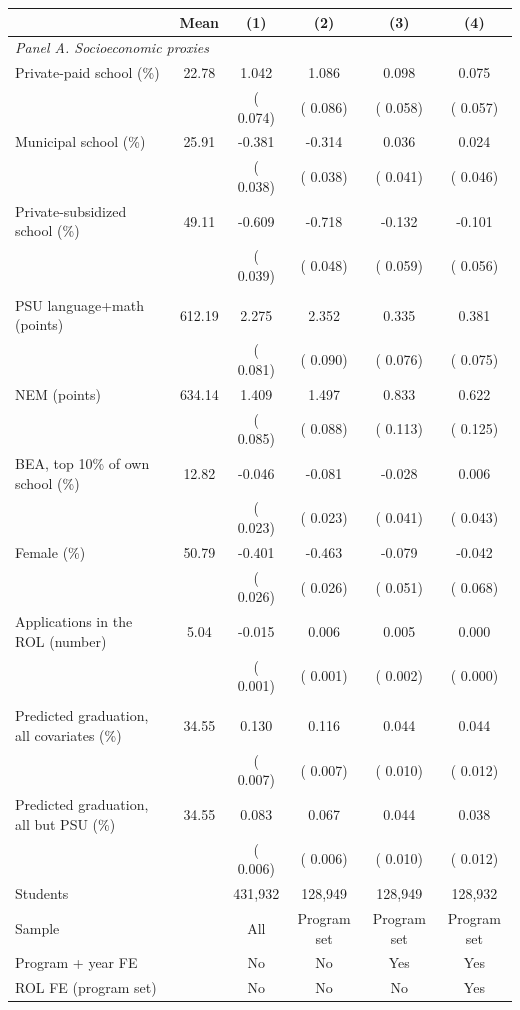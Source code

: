 \begin{tabular}{lccccc}
\toprule
 & Mean & (1) & (2) & (3) & (4) \\
\midrule
\multicolumn{6}{l}{\textit{Panel A. Socioeconomic proxies}} \\
Private-paid school (\%) &  22.78 &   1.042\sym{***} &   1.086\sym{***} &   0.098\sym{*} &   0.075 \\
 & & ( 0.074) & ( 0.086) & ( 0.058) & ( 0.057) \\
Municipal school (\%) &  25.91 &  -0.381\sym{***} &  -0.314\sym{***} &   0.036 &   0.024 \\
 & & ( 0.038) & ( 0.038) & ( 0.041) & ( 0.046) \\
Private-subsidized school (\%) &  49.11 &  -0.609\sym{***} &  -0.718\sym{***} &  -0.132\sym{**} &  -0.101\sym{*} \\
 & & ( 0.039) & ( 0.048) & ( 0.059) & ( 0.056) \\
\addlinespace
\multicolumn{6}{l}{\textit{Panel B. Achievement and other predetermined}} \\
PSU language+math (points) & 612.19 &   2.275\sym{***} &   2.352\sym{***} &   0.335\sym{***} &   0.381\sym{***} \\
 & & ( 0.081) & ( 0.090) & ( 0.076) & ( 0.075) \\
NEM (points) & 634.14 &   1.409\sym{***} &   1.497\sym{***} &   0.833\sym{***} &   0.622\sym{***} \\
 & & ( 0.085) & ( 0.088) & ( 0.113) & ( 0.125) \\
BEA, top 10\% of own school (\%) &  12.82 &  -0.046\sym{**} &  -0.081\sym{***} &  -0.028 &   0.006 \\
 & & ( 0.023) & ( 0.023) & ( 0.041) & ( 0.043) \\
Female (\%) &  50.79 &  -0.401\sym{***} &  -0.463\sym{***} &  -0.079 &  -0.042 \\
 & & ( 0.026) & ( 0.026) & ( 0.051) & ( 0.068) \\
Applications in the ROL (number) &   5.04 &  -0.015\sym{***} &   0.006\sym{***} &   0.005\sym{**} &   0.000 \\
 & & ( 0.001) & ( 0.001) & ( 0.002) & ( 0.000) \\
\addlinespace
\multicolumn{6}{l}{\textit{Joint tests}} \\
Predicted graduation, all covariates (\%) &  34.55 &   0.130\sym{***} &   0.116\sym{***} &   0.044\sym{***} &   0.044\sym{***} \\
 & & ( 0.007) & ( 0.007) & ( 0.010) & ( 0.012) \\
Predicted graduation, all but PSU (\%) &  34.55 &   0.083\sym{***} &   0.067\sym{***} &   0.044\sym{***} &   0.038\sym{***} \\
 & & ( 0.006) & ( 0.006) & ( 0.010) & ( 0.012) \\
\midrule
Students &  &   431,932 &   128,949 &   128,949 &   128,932 \\
Sample & & All & Program set & Program set & Program set \\
Program + year FE & & No & No & Yes & Yes \\
ROL FE (program set) & & No & No & No & Yes \\
\bottomrule
\end{tabular}
